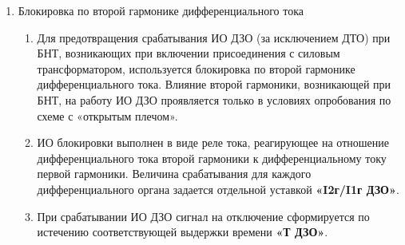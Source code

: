 \begin{enumerate}[label=\arabic{section}.\arabic{subsection}.\arabic{enumi}, labelsep=4pt, leftmargin=0pt, itemindent=57pt, itemsep=0pt, parsep=5pt]
\begin{enumerate}[label=\arabic{section}.\arabic{subsection}.\arabic{enumi}.\arabic*, labelsep=4pt, leftmargin=0em, itemindent=65pt, parsep=0pt]
\item
В устройстве предусмотрено два подхода для надежного отключения выключателей присоединений при работе ДЗО, в том числе в режимах АПВ шин и опробования.
Такие режимы могут сопровождаться пониженным уровнем токов КЗ, в результате чего чувствительность дифференциальных органов может быть недостаточной.
Первый подход подразумевает применение ЧТО. Второй подход заключается в очувствлении уставок тормозной характеристики, которые используются в ДОТХ, БДО и МДО.

\item
ЧТО выполнен в виде реле тока, включенного на дифференциальный ток. Ток срабатывания ЧТО задается отдельной уставкой: \textbf{«Iчто»}.

\item
Очувствление представляет собой автоматическую смену величины начального тока срабатывания тормозной характеристики на более чувствительную уставку.
Параметры тормозной характеристики в режиме очувствления задаются отдельными уставками.
Подробное описание алгоритма очувствления приведен в разделе «Логика очувствления».

\end{enumerate}


\item Блокировка по второй гармонике дифференциального тока

\begin{enumerate}[label=\arabic{section}.\arabic{subsection}.\arabic{enumi}.\arabic*, labelsep=4pt, leftmargin=0em, itemindent=65pt, parsep=0pt]

\item
Для предотвращения срабатывания ИО ДЗО (за исключением ДТО) при БНТ, возникающих при включении присоединения с силовым трансформатором, используется блокировка по второй гармонике дифференциального тока.
Влияние второй гармоники, возникающей при БНТ, на работу ИО ДЗО проявляется только в условиях опробования по схеме с «открытым плечом».

\item
ИО блокировки выполнен в виде реле тока, реагирующее на отношение дифференциального тока второй гармоники к дифференциальному току первой гармоники.
Величина срабатывания для каждого дифференциального органа задается отдельной уставкой \textbf{«I2г/I1г ДЗО»}.

\item
При срабатывании ИО ДЗО сигнал на отключение сформируется по истечению соответствующей выдержки времени \textbf{«Т ДЗО»}.


\end{enumerate}
\end{enumerate}
